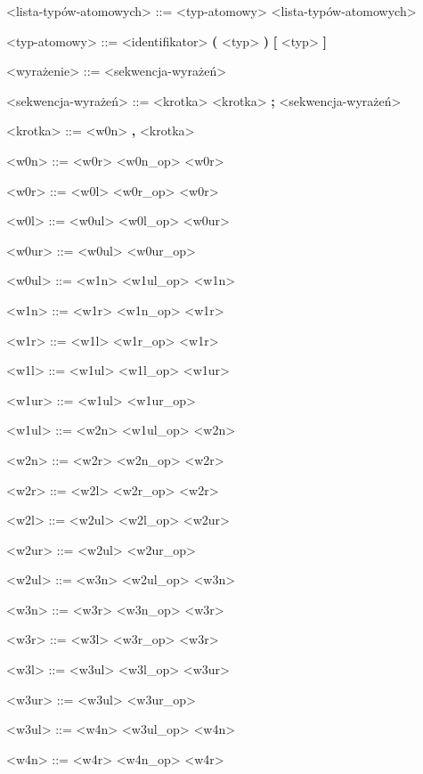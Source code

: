 \documentclass[12pt]{article}
\begin{document}
\begin{grammar}
<lista-typów-atomowych> ::=
    <typ-atomowy>
     <lista-typów-atomowych>

<typ-atomowy> ::=
    <identifikator>
    \alt \textbf{(} <typ> \textbf{)}
    \alt \textbf{[} <typ> \textbf{]}

<wyrażenie> ::=
    <sekwencja-wyrażeń>

<sekwencja-wyrażeń> ::=
    <krotka>
    \alt <krotka> \textbf{;} <sekwencja-wyrażeń>

<krotka> ::=
    <w0n>
     \textbf{,} <krotka>

<w0n> ::=
    <w0r>
     <w0n_op> <w0r>

<w0r> ::=
    <w0l>
     <w0r_op> <w0r>

<w0l> ::=
    <w0ul>
     <w0l_op> <w0ur>

<w0ur> ::=
    <w0ul>
     <w0ur_op> 
    
<w0ul> ::=
    <w1n>
    \alt <w1ul_op> <w1n>

<w1n> ::=
    <w1r>
     <w1n_op> <w1r>

<w1r> ::=
    <w1l>
     <w1r_op> <w1r>

<w1l> ::=
    <w1ul>
     <w1l_op> <w1ur>

<w1ur> ::=
    <w1ul>
     <w1ur_op> 
    
<w1ul> ::=
    <w2n>
    \alt <w1ul_op> <w2n>

<w2n> ::=
    <w2r>
     <w2n_op> <w2r>

<w2r> ::=
    <w2l>
     <w2r_op> <w2r>

<w2l> ::=
    <w2ul>
     <w2l_op> <w2ur>

<w2ur> ::=
    <w2ul>
     <w2ur_op> 
    
<w2ul> ::=
    <w3n>
    \alt <w2ul_op> <w3n>

    <w3n> ::=
    <w3r>
     <w3n_op> <w3r>

<w3r> ::=
    <w3l>
     <w3r_op> <w3r>

<w3l> ::=
    <w3ul>
     <w3l_op> <w3ur>

<w3ur> ::=
    <w3ul>
     <w3ur_op> 
    
<w3ul> ::=
    <w4n>
    \alt <w3ul_op> <w4n>

<w4n> ::=
    <w4r>
     <w4n_op> <w4r>


\end{grammar}
\end{document}
